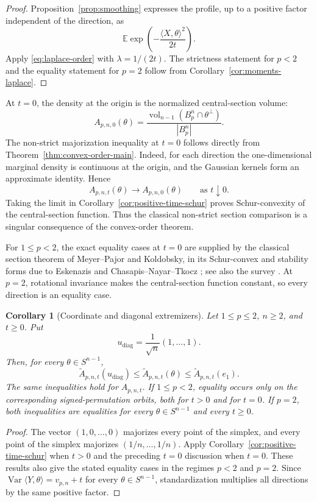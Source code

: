 \documentclass[pdflatex,sn-mathphys-num]{sn-jnl}
\numberwithin{equation}{section}
\theoremstyle{thmstyleone}
\newtheorem{corollary}[theorem]{Corollary}
\theoremstyle{thmstylethree}
\newcommand{\E}{\mathbb{E}}
\DeclareMathOperator{\Var}{Var}
\DeclareMathOperator{\vol}{vol}
\newcommand{\1}{\mathbf{1}}
\newcommand{\sphere}{S^{n-1}}
\newcommand{\diag}{u_{\mathrm{diag}}}
\begin{document}
\begin{proof}
Proposition~\ref{prop:smoothing} expresses the profile, up to a positive
factor independent of the direction, as
\[
 \E\exp\left(-\frac{\langle X,\theta\rangle^2}{2t}\right).
\]
Apply \eqref{eq:laplace-order} with $\lambda=1/(2t)$. The strictness
statement for $p<2$ and the equality statement for $p=2$ follow from
Corollary~\ref{cor:moments-laplace}.
\end{proof}

At $t=0$, the density at the origin is the normalized central-section
volume:
\begin{equation}\label{eq:section-density}
 A_{p,n,0}(\theta)
 =
 \frac{\vol_{n-1}(B_p^n\cap\theta^\perp)}{|B_p^n|}.
\end{equation}
The non-strict majorization inequality at $t=0$ follows directly from
Theorem~\ref{thm:convex-order-main}. Indeed, for each direction the
one-dimensional marginal density is continuous at the origin, and the
Gaussian kernels form an approximate identity. Hence
\[
 A_{p,n,t}(\theta)\longrightarrow A_{p,n,0}(\theta)
 \qquad\text{as }t\downarrow0.
\]
Taking the limit in Corollary~\ref{cor:positive-time-schur} proves
Schur-convexity of the central-section function. Thus the classical
non-strict section comparison is a singular consequence of the
convex-order theorem.

For $1\le p<2$, the exact equality cases at $t=0$ are supplied by
the classical section theorem of Meyer--Pajor and Koldobsky, in its
Schur-convex and stability forms due to Eskenazis and
Chasapis--Nayar--Tkocz
\cite{MeyerPajor,Koldobsky1998,KoldobskyBook,Eskenazis,ChasapisNayarTkocz};
see also the survey \cite{NayarTkoczSurvey}. At $p=2$, rotational
invariance makes the central-section function constant, so every
direction is an equality case.

\begin{corollary}[Coordinate and diagonal extremizers]\label{cor:all-time-extremizers}
Let $1\le p\le2$, $n\ge2$, and $t\ge0$. Put
\[
 \diag=\frac1{\sqrt n}(1,\ldots,1).
\]
Then, for every $\theta\in\sphere$,
\[
 \widetilde A_{p,n,t}(\diag)
 \le
 \widetilde A_{p,n,t}(\theta)
 \le
 \widetilde A_{p,n,t}(e_1).
\]
The same inequalities hold for $A_{p,n,t}$. If $1\le p<2$, equality
occurs only on the corresponding signed-permutation orbits, both for
$t>0$ and for $t=0$. If $p=2$, both inequalities are equalities for
every $\theta\in\sphere$ and every $t\ge0$.
\end{corollary}

\begin{proof}
The vector $(1,0,\ldots,0)$ majorizes every point of the simplex, and
every point of the simplex majorizes $(1/n,\ldots,1/n)$. Apply Corollary~\ref{cor:positive-time-schur} when $t>0$ and the
preceding $t=0$ discussion when $t=0$. These results also give the
stated equality cases in the regimes $p<2$ and $p=2$. Since
$\Var\langle Y,\theta\rangle=v_{p,n}+t$ for every
$\theta\in\sphere$, standardization multiplies all directions by the
same positive factor.
\end{proof}
\end{document}
